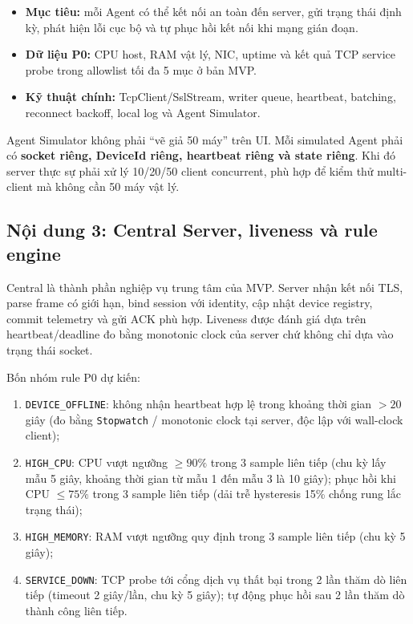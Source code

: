 \begin{itemize}
    \item \textbf{Mục tiêu:} mỗi Agent có thể kết nối an toàn đến server, gửi trạng thái định kỳ, phát hiện lỗi cục bộ và tự phục hồi kết nối khi mạng gián đoạn.
    \item \textbf{Dữ liệu P0:} CPU host, RAM vật lý, NIC, uptime và kết quả TCP service probe trong allowlist tối đa 5 mục ở bản MVP.
    \item \textbf{Kỹ thuật chính:} TcpClient/SslStream, writer queue, heartbeat, batching, reconnect backoff, local log và Agent Simulator.
\end{itemize}

\begin{examplebox}
Agent Simulator không phải ``vẽ giả 50 máy'' trên UI. Mỗi simulated Agent phải có \textbf{socket riêng, DeviceId riêng, heartbeat riêng và state riêng}. Khi đó server thực sự phải xử lý 10/20/50 client concurrent, phù hợp để kiểm thử multi-client mà không cần 50 máy vật lý.
\end{examplebox}

\subsection{Nội dung 3: Central Server, liveness và rule engine}

Central là thành phần nghiệp vụ trung tâm của MVP. Server nhận kết nối TLS, parse frame có giới hạn, bind session với identity, cập nhật device registry, commit telemetry và gửi ACK phù hợp. Liveness được đánh giá dựa trên heartbeat/deadline đo bằng monotonic clock của server chứ không chỉ dựa vào trạng thái socket.

Bốn nhóm rule P0 dự kiến:
\begin{enumerate}
    \item \texttt{DEVICE\_OFFLINE}: không nhận heartbeat hợp lệ trong khoảng thời gian $> 20$ giây (đo bằng \texttt{Stopwatch} / monotonic clock tại server, độc lập với wall-clock client);
    \item \texttt{HIGH\_CPU}: CPU vượt ngưỡng $\ge 90\%$ trong 3 sample liên tiếp (chu kỳ lấy mẫu 5 giây, khoảng thời gian từ mẫu 1 đến mẫu 3 là 10 giây); phục hồi khi CPU $\le 75\%$ trong 3 sample liên tiếp (dải trễ hysteresis 15\% chống rung lắc trạng thái);
    \item \texttt{HIGH\_MEMORY}: RAM vượt ngưỡng quy định trong 3 sample liên tiếp (chu kỳ 5 giây);
    \item \texttt{SERVICE\_DOWN}: TCP probe tới cổng dịch vụ thất bại trong 2 lần thăm dò liên tiếp (timeout 2 giây/lần, chu kỳ 5 giây); tự động phục hồi sau 2 lần thăm dò thành công liên tiếp.
\end{enumerate}

